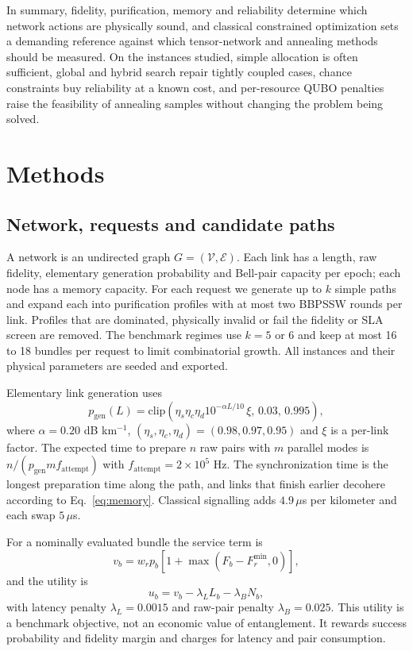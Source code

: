 \documentclass[pdflatex,sn-nature]{sn-jnl}
\newcommand{\Eset}{\mathcal{E}}
\newcommand{\Vset}{\mathcal{V}}
\theoremstyle{plain}
\theoremstyle{remark}
\begin{document}
In summary, fidelity, purification, memory and reliability determine which network actions are physically sound, and classical constrained optimization sets a demanding reference against which tensor-network and annealing methods should be measured. On the instances studied, simple allocation is often sufficient, global and hybrid search repair tightly coupled cases, chance constraints buy reliability at a known cost, and per-resource QUBO penalties raise the feasibility of annealing samples without changing the problem being solved.

\section{Methods}\label{sec:methods}

\subsection{Network, requests and candidate paths}

A network is an undirected graph $G=(\Vset,\Eset)$. Each link has a length, raw fidelity, elementary generation probability and Bell-pair capacity per epoch; each node has a memory capacity. For each request we generate up to $k$ simple paths and expand each into purification profiles with at most two BBPSSW rounds per link. Profiles that are dominated, physically invalid or fail the fidelity or SLA screen are removed. The benchmark regimes use $k=5$ or 6 and keep at most 16 to 18 bundles per request to limit combinatorial growth. All instances and their physical parameters are seeded and exported.

Elementary link generation uses
\begin{equation}
p_{\mathrm{gen}}(L)=\mathrm{clip}\!\left(\eta_s\eta_c\eta_d10^{-\alpha L/10}\,\xi,\,0.03,\,0.995\right),
\end{equation}
where $\alpha=0.20$ dB km$^{-1}$, $(\eta_s,\eta_c,\eta_d)=(0.98,0.97,0.95)$ and $\xi$ is a per-link factor. The expected time to prepare $n$ raw pairs with $m$ parallel modes is $n/(p_{\mathrm{gen}}mf_{\mathrm{attempt}})$ with $f_{\mathrm{attempt}}=2\times10^5$ Hz. The synchronization time is the longest preparation time along the path, and links that finish earlier decohere according to Eq.~\ref{eq:memory}. Classical signalling adds $4.9\,\mu$s per kilometer and each swap $5\,\mu$s.

For a nominally evaluated bundle the service term is
\begin{equation}
v_b=w_r p_b\left[1+\max(F_b-F_r^{\min},0)\right],
\end{equation}
and the utility is
\begin{equation}
u_b=v_b-\lambda_L L_b-\lambda_B N_b,
\end{equation}
with latency penalty $\lambda_L=0.0015$ and raw-pair penalty $\lambda_B=0.025$. This utility is a benchmark objective, not an economic value of entanglement. It rewards success probability and fidelity margin and charges for latency and pair consumption.
\end{document}

